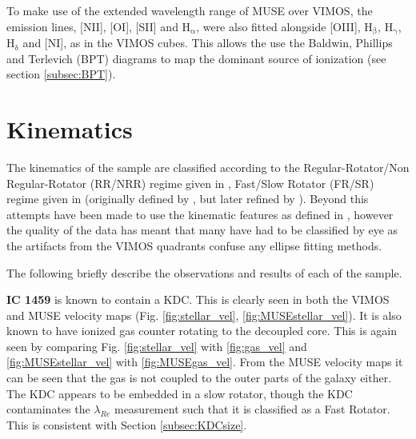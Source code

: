 \documentclass[fleqn,usenatbib,useAMS]{mnras}
\begin{document}

	To make use of the extended wavelength range of MUSE over VIMOS, the emission lines, [NII], [OI], [SII] and H$_\mathrm{\alpha}$, were also fitted alongside [OIII], H$_\mathrm{\beta}$, H$_\mathrm{\gamma}$, H$_\mathrm{\delta}$ and [NI], as in the VIMOS cubes. This allows the use the Baldwin, Phillips and Terlevich (BPT) diagrams to map the dominant source of ionization (see section \ref{subsec:BPT}).


\section{Kinematics}
	\label{sec:kine}
	The kinematics of the sample are classified according to the Regular-Rotator/Non Regular-Rotator (RR/NRR) regime given in \citet{Krajnovic2011}, Fast/Slow Rotator (FR/SR) regime given in \citet{Cappellari2016} (originally defined by \citet{Emsellem2011}, but later refined by \citet{Cappellari2016}). Beyond this attempts have been made to use the kinematic features as defined in \citet{Krajnovic2011}, however the quality of the data has meant that many have had to be classified by eye as the artifacts from the VIMOS quadrants confuse any ellipse fitting methods. 

	The following briefly describe the observations and results of each of the sample. %

	\textbf{IC 1459} is known to contain a KDC. This is clearly seen in both the VIMOS and MUSE velocity maps (Fig. \ref{fig:stellar_vel}, \ref{fig:MUSEstellar_vel}). It is also known to have ionized gas counter rotating to the decoupled core. This is again seen by comparing Fig. \ref{fig:stellar_vel} with \ref{fig:gas_vel} and \ref{fig:MUSEstellar_vel} with \ref{fig:MUSEgas_vel}. From the MUSE velocity maps it can be seen that the gas is not coupled to the outer parts of the galaxy either. The KDC appears to be embedded in a slow rotator, though the KDC contaminates the $\lambda_{Re}$ measurement such that it is classified as a Fast Rotator. This is consistent with Section \ref{subsec:KDCsize}.
\end{document}
